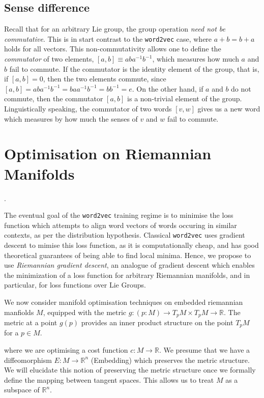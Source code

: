 \documentclass[11pt]{book}
\begin{document}
\subsection{Sense difference}

Recall that for an arbitrary Lie group, the group operation \emph{need not be commutative}. This is
in start contrast to the \texttt{word2vec} case, where $a + b = b + a$ holds for all vectors. This
non-commutativity allows one to define the \emph{commutator} of two elements, $[a, b] \equiv aba^{-1}b^{-1}$,
which measures how much $a$ and $b$ fail to commute. If the commutator is the identity element of the group,
that is, if $[a, b] = 0$, then the two elements commute, since $[a, b] = aba^{-1}b^{-1} = baa^{-1}b^{-1} = bb^{-1} = e$.
On the other hand, if $a$ and $b$ do not commute, then the commutator $[a, b]$ is a non-trivial element of
the group. Linguistically speaking, the commutator of two words $[v, w]$ gives us a new word which measures
by how much the senses of $v$ and $w$ fail to commute.



\section{Optimisation on Riemannian Manifolds}
\label{section:optim-on-riem}.


The eventual goal of the \texttt{word2vec} training regime is to minimise the loss function which attempts
to align word vectors of words occuring in similar contexts, as per the distribution hypothesis. Classical \texttt{word2vec}
uses gradient descent to mimise this loss function, as it is computationally cheap, and has good theoretical
guarantees of being able to find local minima. Hence, we propose to use \emph{Riemannian gradient descent}, an analogue
of gradient descent which enables the minimization of a loss function
for arbitrary Riemannian manifolds, and in particular, for loss functions over Lie Groups.

We now consider manifold optimisation techniques on embedded riemannian manfiolds $M$,
equipped with the metric $g: (p: M) \rightarrow T_p M  \times T_p M \rightarrow \mathbb R$.
The metric at a point $g(p)$ provides an inner product structure on the point $T_pM$
for a $p \in M$.

where we are optimising a cost function $c: M \rightarrow \mathbb R$.
We presume that we have a diffeomorphism $E: M \rightarrow \mathbb R^n$ (Embedding) which
preserves the metric structure. We will elucidate this notion of preserving
the metric structure once we formally define the mapping between tangent spaces.
This allows us to treat $M$ as a subspace of $\mathbb R^n$.
\end{document}
